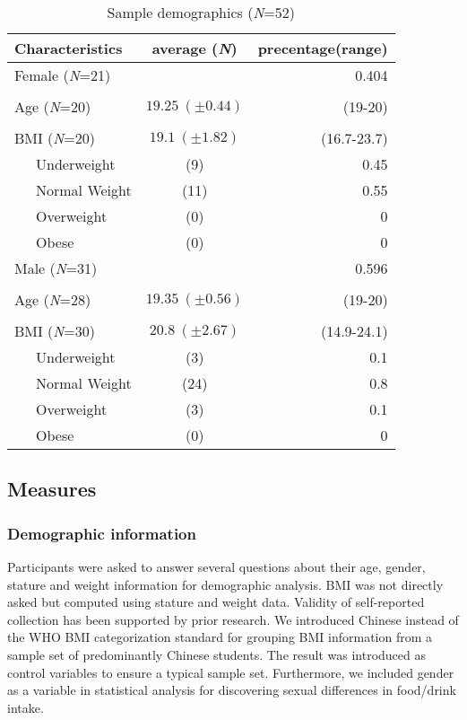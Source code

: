 \documentclass[letterpaper]{article}
\begin{document}
\renewcommand\tablename{\textbf{Table}}
\begin{table}[htbp]
    \caption{Sample demographics (\textit{N}=52)}
    \centering
    \begin{tabular}{lcr} 
        \toprule
        Characteristics & average (\textit{N}) & precentage(range) \\
        \midrule
        Female (\textit{N}=21) &  & 0.404 \\ \\
        Age (\textit{N}=20) & \(19.25~(\pm 0.44)\) & (19-20)\\ \\
        BMI (\textit{N}=20) & \(19.1~(\pm 1.82)\) & (16.7-23.7) \\
        ~~~Underweight & (9) & 0.45 \\
        ~~~Normal Weight & (11) & 0.55 \\
        ~~~Overweight & (0) & 0 \\
        ~~~Obese & (0) & 0 \\
        \midrule
        Male (\textit{N}=31) &  & 0.596 \\ \\
        Age (\textit{N}=28) & \(19.35~(\pm 0.56)\) & (19-20)\\ \\
        BMI (\textit{N}=30) & \(20.8~(\pm 2.67)\) & (14.9-24.1)\\ 
        ~~~Underweight & (3) & 0.1 \\
        ~~~Normal Weight & (24) & 0.8 \\
        ~~~Overweight & (3) & 0.1 \\
        ~~~Obese & (0) & 0 \\
        \bottomrule
    \end{tabular}
\end{table}

\subsection{Measures}
\subsubsection{Demographic information}
Participants were asked to answer several questions about their
age, gender, stature and weight information for demographic analysis. BMI
 was not directly asked but computed using stature and weight data.
Validity of self-reported collection has been supported by prior research\cite{kuczmarski2001effects}.
We introduced Chinese instead of the WHO BMI categorization standard for grouping BMI information from
a sample set of predominantly Chinese students. The result was introduced as control variables to
ensure a typical sample set. Furthermore, we included gender as a variable in statistical analysis for 
discovering sexual differences in food/drink intake.
\end{document}
